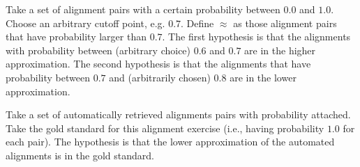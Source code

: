\documentclass[11pt,a4paper,notitlepage,onecolumn,twoside]{article}
\begin{document}
Take a set of alignment pairs with a certain probability between $0.0$ and $1.0$. Choose an arbitrary cutoff point, e.g. $0.7$. Define $\approx$ as those alignment pairs that have probability larger than $0.7$. The first hypothesis is that the alignments with probability between (arbitrary choice) $0.6$ and $0.7$ are in the higher approximation. The second hypothesis is that the alignments that have probability between $0.7$ and (arbitrarily chosen) $0.8$ are in the lower approximation.

Take a set of automatically retrieved alignments pairs with probability attached. Take the gold standard for this alignment exercise (i.e., having probability $1.0$ for each pair). The hypothesis is that the lower approximation of the automated alignments is in the gold standard.
\end{document}
